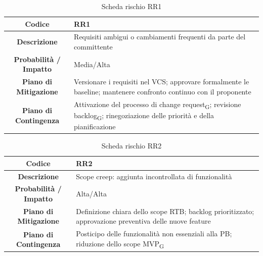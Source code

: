 \begin{table}[H]
	\centering
	\renewcommand{\arraystretch}{1.3}
	\begin{tabularx}{\textwidth}{|c|X|}
		\hline
		\textbf{Codice} & \textbf{RR1} \\
		\hline
		\textbf{Descrizione} & Requisiti ambigui o cambiamenti frequenti da parte del committente \\
		\hline
		\textbf{Probabilità / Impatto} & Media/Alta \\
		\hline
		\textbf{Piano di Mitigazione} & Versionare i requisiti nel VCS; approvare formalmente le baseline; mantenere confronto continuo con il proponente \\
		\hline
		\textbf{Piano di Contingenza} & Attivazione del processo di change request\textsubscript{G}; revisione backlog\textsubscript{G}; rinegoziazione delle priorità e della pianificazione \\
		\hline
	\end{tabularx}
	\caption{Scheda rischio RR1}
\end{table}

\begin{table}[H]
	\centering
	\renewcommand{\arraystretch}{1.3}
	\begin{tabularx}{\textwidth}{|c|X|}
		\hline
		\textbf{Codice} & \textbf{RR2} \\
		\hline
		\textbf{Descrizione} & Scope creep: aggiunta incontrollata di funzionalità \\
		\hline
		\textbf{Probabilità / Impatto} & Alta/Alta \\
		\hline
		\textbf{Piano di Mitigazione} & Definizione chiara dello scope RTB; backlog prioritizzato; approvazione preventiva delle nuove feature \\
		\hline
		\textbf{Piano di Contingenza} & Posticipo delle funzionalità non essenziali alla PB; riduzione dello scope MVP\textsubscript{G} \\		
		\hline
	\end{tabularx}
	\caption{Scheda rischio RR2}
\end{table}

